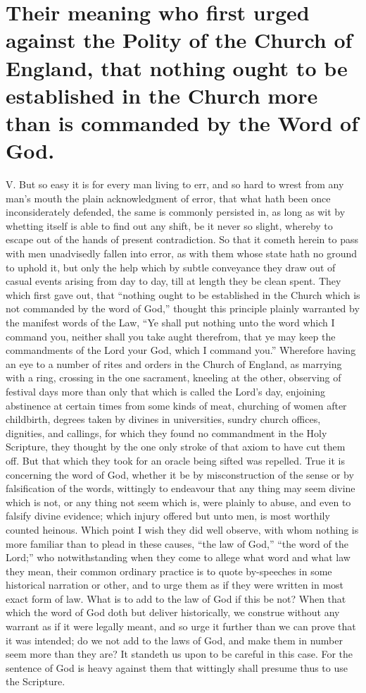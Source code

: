 \section*{Their meaning who first urged against the Polity of the Church of England, that nothing ought to be established in the Church more than is commanded by the Word of God.}

V. But so easy it is for every man living to err, and so hard to wrest from any man’s mouth the plain acknowledgment of error, that what hath been once inconsiderately defended, the same is commonly persisted in, as long as wit by whetting itself is able to find out any shift, be it never so slight, whereby to escape out of the hands of present contradiction. So that it cometh herein to pass with men unadvisedly fallen into error, as with them whose state hath no ground to uphold it, but only the help which by subtle conveyance they draw out of casual events arising from day to day, till at length they be clean spent. They which first gave out, that “nothing ought to be established in the Church which is not commanded by the word of God,” thought this principle plainly warranted by the manifest words of the Law, “Ye shall put nothing unto the word which I command you, neither shall you take aught therefrom, that ye may keep the commandments of the Lord your God, which I command you.” Wherefore having an eye to a number of rites and orders in the Church of England, as marrying with a ring, crossing in the one sacrament, kneeling at the other, observing of festival days more than only that which is called the Lord’s day, enjoining abstinence at certain times from some kinds of meat, churching of women after childbirth, degrees taken by divines in universities, sundry church offices, dignities, and callings, for which they found no commandment in the Holy Scripture, they thought by the one only stroke of that axiom to have cut them off. But that which they took for an oracle being sifted was repelled. True it is concerning the word of God, whether it be by misconstruction of the sense or by falsification of the words, wittingly to endeavour that any thing may seem divine which is not, or any thing not seem which is, were plainly to abuse, and even to falsify divine evidence; which injury offered but unto men, is most worthily counted heinous. Which point I wish they did well observe, with whom nothing is more familiar than to plead in these causes, “the law of God,” “the word of the Lord;” who notwithstanding when  they come to allege what word and what law they mean, their common ordinary practice is to quote by-speeches in some historical narration or other, and to urge them as if they were written in most exact form of law. What is to add to the law of God if this be not? When that which the word of God doth but deliver historically, we construe without any warrant as if it were legally meant, and so urge it further than we can prove that it was intended; do we not add to the laws of God, and make them in number seem more than they are? It standeth us upon to be careful in this case. For the sentence of God is heavy against them that wittingly shall presume thus to use the Scripture.

